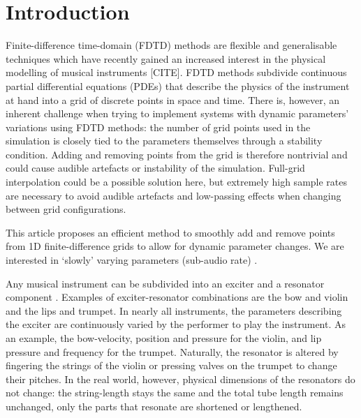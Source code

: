 \section{Introduction}

Finite-difference time-domain (FDTD) methods are flexible and generalisable techniques which have recently gained an increased interest in the physical modelling of musical instruments [CITE]. %
FDTD methods subdivide continuous partial differential equations (PDEs) that describe the physics of the instrument at hand into a grid of discrete points in space and time. 
There is, however, an inherent challenge when trying to implement systems with dynamic parameters' variations using FDTD methods: the number of grid points used in the simulation is closely tied to the parameters themselves through a stability condition.
Adding and removing points from the grid is therefore nontrivial and could cause audible artefacts or instability of the simulation. Full-grid interpolation \cite[Ch. 5]{bilbao2009} could be a possible solution here, but extremely high sample rates are necessary to avoid audible artefacts and low-passing effects when changing between grid configurations. 

This article proposes an efficient method to smoothly add and remove points from 1D finite-difference grids to allow for dynamic parameter changes. We are interested in `slowly' varying parameters (sub-audio rate) .

Any musical instrument can be subdivided into an exciter and a resonator component \cite{Borin1989}.  Examples of exciter-resonator combinations are the bow and violin and the lips and trumpet. In nearly all instruments, the parameters describing the exciter are continuously varied by the performer to play the instrument. As an example, the bow-velocity, position and pressure for the violin, and lip pressure and frequency for the trumpet. Naturally, the resonator is altered by fingering the strings of the violin or pressing valves on the trumpet to change their pitches. In the real world, however, physical dimensions of the resonators do not change: the string-length stays the same and the total tube length remains unchanged, only the parts that resonate are shortened or lengthened.

